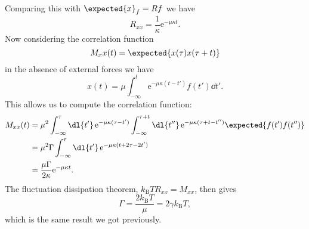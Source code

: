 \documentclass[fleqn]{NotesClass}
\newcommand*{\boltzmann}{k_{\mathrm{B}}}
\newcommand*{\e}{\mathrm{e}}
\begin{document}
    Comparing this with \(\expected{x}_f = Rf\) we have
    \begin{equation}
        R_{xx} = \frac{1}{\kappa}\e^{-\mu\kappa t}.
    \end{equation}
    Now considering the correlation function
    \begin{equation}
        M_xx(t) = \expected{x(\tau)x(\tau + t)}
    \end{equation}
    in the absence of external forces we have
    \begin{equation}
        x(t) = \mu \int_{-\infty}^t \e^{-\mu \kappa(t - t')} f(t') \dd{t'}.
    \end{equation}
    This allows us to compute the correlation function:
    \begin{align}
        M_{xx}(t) &= \mu^2\int_{-\infty}^{\tau} \dl{t'} \, \e^{-\mu\kappa(\tau - t')} \int_{-\infty}^{\tau + t} \dl{t''} \, \e^{-\mu\kappa(\tau + t - t'')} \expected{f(t')f(t'')}\\
        &= \mu^2 \Gamma \int_{-\infty}^{\tau} \dl{t'} \, \e^{-\mu\kappa(t + 2\tau - 2t')}\\
        &= \frac{\mu\Gamma}{2\kappa} \e^{-\mu\kappa t}.
    \end{align}
    The fluctuation dissipation theorem, \(\boltzmann T R_{xx} = M_{xx}\), then gives
    \begin{equation}
        \Gamma = \frac{2\boltzmann T}{\mu} = 2\gamma\boltzmann T,
    \end{equation}
    which is the same result we got previously.
    
%        
    
    \backmatter
    \renewcommand{\glossaryname}{Acronyms}
    \printglossary[acronym]
    \printindex
\end{document}
